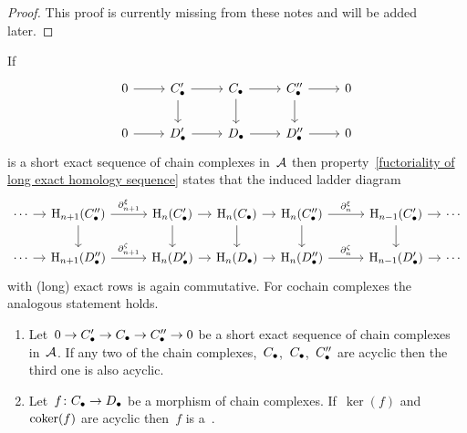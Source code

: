 \begin{proof}
  This proof is currently missing from these notes and will be added later.
\end{proof}


\begin{remark*}
  If
  \[
    \begin{tikzcd}
        0
        \arrow{r}
      & \Ccc'
        \arrow{r}
        \arrow{d}
      & \Ccc
        \arrow{r}
        \arrow{d}
      & \Ccc''
        \arrow{r}
        \arrow{d}
      & 0
      \\
        0
        \arrow{r}
      & \Dcc'
        \arrow{r}
      & \Dcc
        \arrow{r}
      & \Dcc''
        \arrow{r}
      & 0
    \end{tikzcd}
  \]
  is a short exact sequence of chain complexes in~$\mathcal{A}$ then property~\ref*{fuctoriality of long exact homology sequence} states that the induced ladder diagram
  \[
    \begin{tikzcd}[column sep = 1em]
        \dotsb
        \arrow{r}
      & \Hl_{n+1}(\Ccc'')
        \arrow{rr}[above]{\del_{n+1}^\xi}
        \arrow{d}
      & {}
      & \Hl_{n}(\Ccc')
        \arrow{r}
        \arrow{d}
      & \Hl_{n}(\Ccc)
        \arrow{r}
        \arrow{d}
      & \Hl_{n}(\Ccc'')
        \arrow{rr}[above]{\del_n^\xi}
        \arrow{d}
      & {}
      & \Hl_{n-1}(\Ccc')
        \arrow{r}
        \arrow{d}
      & \dotsb
      \\
        \dotsb
        \arrow{r}
      & \Hl_{n+1}(\Dcc'')
        \arrow{rr}[above]{\del_{n+1}^\zeta}
      & {}
      & \Hl_{n}(\Dcc')
        \arrow{r}
      & \Hl_{n}(\Dcc)
        \arrow{r}
      & \Hl_{n}(\Dcc'')
        \arrow{rr}[above]{\del_n^\zeta}
      & {}
      & \Hl_{n-1}(\Dcc')
        \arrow{r}
      & \dotsb
    \end{tikzcd}
  \]
  with (long) exact rows is again commutative.
  For cochain complexes the analogous statement holds.
\end{remark*}


\begin{lemma*}
  \leavevmode
  \begin{enumerate}
    \item
      Let~$0 \to C_\bullet' \to C_\bullet \to C_\bullet'' \to 0$ be a short exact sequence of chain complexes in~$\mathcal{A}$.
      If any two of the chain complexes,~$C_\bullet$,~$C_\bullet$,~$C_\bullet''$ are acyclic then the third one is also acyclic.
    \item
      Let~$f \colon C_\bullet \to D_\bullet$ be a morphism of chain complexes.
      If~$\ker(f)$ and~$\operatorname{coker}(f)$ are acyclic then~$f$ is a~{\qim}.
  \end{enumerate}
\end{lemma*}


